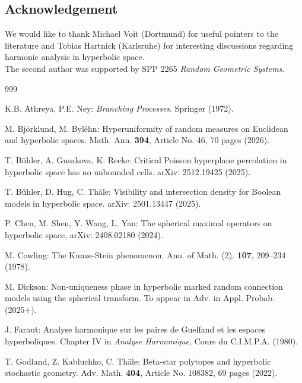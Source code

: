 \documentclass[11pt,a4paper]{article}
\theoremstyle{plain}
\theoremstyle{definition}
\theoremstyle{remark}
\begin{document}
\subsection*{Acknowledgement}

We would like to thank Michael Voit (Dortmund) for useful pointers to the literature and Tobias Hartnick (Karlsruhe) for interesting discussions regarding harmonic analysis in hyperbolic space.\\ The second author was supported by SPP 2265 \textit{Random Geometric Systems}.
    
\begin{thebibliography}{999}

        K.B. Athreya, P.E. Ney: \textit{Branching Processes}. Springer (1972).

        M. Bj\"orklund, M. Byl\'ehn: Hyperuniformity of random measures on Euclidean and hyperbolic spaces. Math. Ann. \textbf{394}, Article No. 46, 70 pages (2026).

        T. B\"uhler, A. Gusakova, K. Recke: Critical Poisson hyperplane percolation in hyperbolic space has no unbounded cells. arXiv: 2512.19425 (2025).
        
        T. B\"uhler, D. Hug, C. Th\"ale: Visibility and intersection density for Boolean models in hyperbolic space. arXiv: 2501.13447 (2025). 
        
        P. Chen, M. Shen, Y. Wang, L. Yan: The spherical maximal operators on hyperbolic space. arXiv: 2408.02180 (2024).

        M. Cowling: The {K}unze-{S}tein phenomenon. Ann. of Math. (2). \textbf{107}, 209--234 (1978).

        M. Dickson: Non-uniqueness phase in hyperbolic marked random connection models using the spherical transform. To appear in Adv. in Appl. Probab. (2025+).

        J. Faraut: Analyse harmonique sur les paires de Guelfand et les espaces hyperboliques. Chapter IV in \textit{Analyse Harmonique}, Cours du C.I.M.P.A. (1980).

        T. Godland, Z. Kabluchko, C. Th\"ale: Beta-star polytopes and hyperbolic stochastic geometry. Adv. Math. \textbf{404}, Article No. 108382, 69 pages (2022).


\end{thebibliography}
\end{document}

